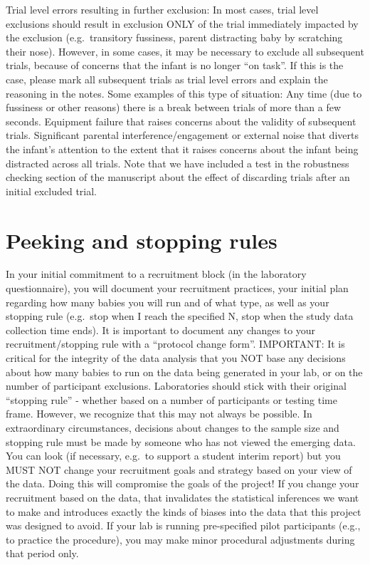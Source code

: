 \documentclass[
]{book}
\begin{document}
Trial level errors resulting in further exclusion: In most cases, trial level exclusions should result in exclusion ONLY of the trial immediately impacted by the exclusion (e.g.~transitory fussiness, parent distracting baby by scratching their nose). However, in some cases, it may be necessary to exclude all subsequent trials, because of concerns that the infant is no longer ``on task''. If this is the case, please mark all subsequent trials as trial level errors and explain the reasoning in the notes. Some examples of this type of situation:
Any time (due to fussiness or other reasons) there is a break between trials of more than a few seconds.
Equipment failure that raises concerns about the validity of subsequent trials.
Significant parental interference/engagement or external noise that diverts the infant's attention to the extent that it raises concerns about the infant being distracted across all trials.
Note that we have included a test in the robustness checking section of the manuscript about the effect of discarding trials after an initial excluded trial.

\section{Peeking and stopping rules}\label{peeking-and-stopping-rules}

In your initial commitment to a recruitment block (in the laboratory questionnaire), you will document your recruitment practices, your initial plan regarding how many babies you will run and of what type, as well as your stopping rule (e.g.~stop when I reach the specified N, stop when the study data collection time ends). It is important to document any changes to your recruitment/stopping rule with a ``protocol change form''.
IMPORTANT: It is critical for the integrity of the data analysis that you NOT base any decisions about how many babies to run on the data being generated in your lab, or on the number of participant exclusions.
Laboratories should stick with their original ``stopping rule'' - whether based on a number of participants or testing time frame. However, we recognize that this may not always be possible. In extraordinary circumstances, decisions about changes to the sample size and stopping rule must be made by someone who has not viewed the emerging data.
You can look (if necessary, e.g.~to support a student interim report) but you MUST NOT change your recruitment goals and strategy based on your view of the data. Doing this will compromise the goals of the project!
If you change your recruitment based on the data, that invalidates the statistical inferences we want to make and introduces exactly the kinds of biases into the data that this project was designed to avoid. If your lab is running pre-specified pilot participants (e.g., to practice the procedure), you may make minor procedural adjustments during that period only.
\end{document}
